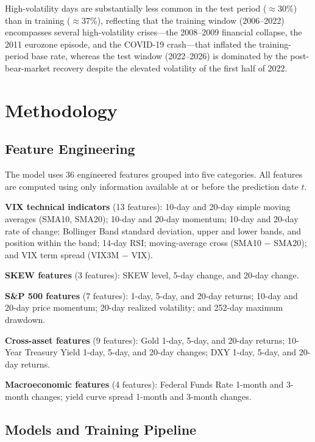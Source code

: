 \documentclass[12pt]{article}
\begin{document}
High-volatility days are substantially less common in the test period ($\approx$30\%) than in training ($\approx$37\%), reflecting that the training window (2006--2022) encompasses several high-volatility crises---the 2008--2009 financial collapse, the 2011 eurozone episode, and the COVID-19 crash---that inflated the training-period base rate, whereas the test window (2022--2026) is dominated by the post-bear-market recovery despite the elevated volatility of the first half of 2022.

\section{Methodology}
\label{sec:methodology}

\subsection{Feature Engineering}

The model uses 36 engineered features grouped into five categories. All features are computed using only information available at or before the prediction date $t$.

\textbf{VIX technical indicators} (13 features): 10-day and 20-day simple moving averages (SMA10, SMA20); 10-day and 20-day momentum; 10-day and 20-day rate of change; Bollinger Band standard deviation, upper and lower bands, and position within the band; 14-day RSI; moving-average cross (SMA10 $-$ SMA20); and VIX term spread (VIX3M $-$ VIX).

\textbf{SKEW features} (3 features): SKEW level, 5-day change, and 20-day change.

\textbf{S\&P 500 features} (7 features): 1-day, 5-day, and 20-day returns; 10-day and 20-day price momentum; 20-day realized volatility; and 252-day maximum drawdown.

\textbf{Cross-asset features} (9 features): Gold 1-day, 5-day, and 20-day returns; 10-Year Treasury Yield 1-day, 5-day, and 20-day changes; DXY 1-day, 5-day, and 20-day returns.

\textbf{Macroeconomic features} (4 features): Federal Funds Rate 1-month and 3-month changes; yield curve spread 1-month and 3-month changes.

\subsection{Models and Training Pipeline}
\end{document}
